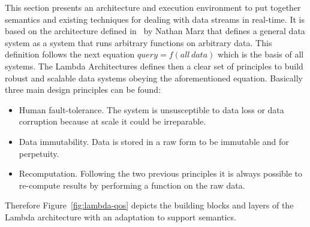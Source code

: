 This section presents an architecture and execution environment to put together 
semantics and existing techniques for dealing with data streams in real-time. 
It is based on the architecture defined in~\cite{BigDataManing} by Nathan Marz that defines 
a general data system as a system that runs arbitrary functions on arbitrary data. This definition 
follows the next equation $query=f(all\,data)$ which is the basis of all systems. The Lambda 
Architectures defines then a clear set of principles to build robust and scalable data 
systems obeying the aforementioned equation. Basically three main design principles 
can be found:
\begin{itemize}
 \item Human fault-tolerance. The system is unsusceptible to data loss or data corruption because at scale it could be irreparable.
 \item Data immutability. Data is stored in a raw form to be immutable and for perpetuity.
 \item Recomputation. Following the two previous principles it is always possible 
 to re-compute results by performing a function on the raw data.
\end{itemize}

Therefore Figure~\ref{fig:lambda-qos} depicts the building blocks and layers of the Lambda architecture with 
an adaptation to support semantics. 

